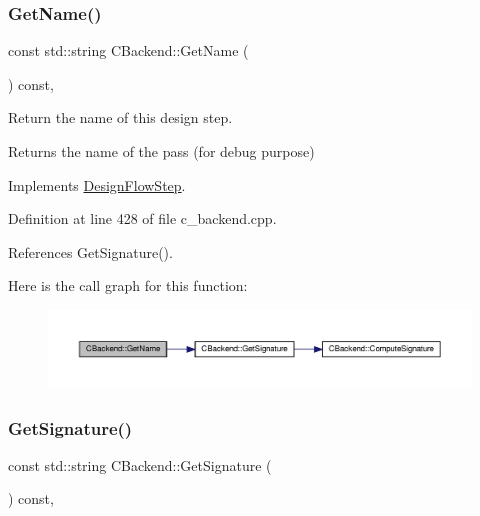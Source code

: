 \subsubsection{\texorpdfstring{Get\+Name()}{GetName()}}
{\footnotesize\ttfamily const std\+::string C\+Backend\+::\+Get\+Name (\begin{DoxyParamCaption}{ }\end{DoxyParamCaption}) const\hspace{0.3cm}{\ttfamily [override]}, {\ttfamily [virtual]}}



Return the name of this design step. 

\begin{DoxyReturn}{Returns}
the name of the pass (for debug purpose) 
\end{DoxyReturn}


Implements \hyperlink{classDesignFlowStep_a01e5ebfab88db3b3b7f832f80075fad8}{Design\+Flow\+Step}.



Definition at line 428 of file c\+\_\+backend.\+cpp.



References Get\+Signature().

Here is the call graph for this function\+:
\nopagebreak
\begin{figure}[H]
\begin{center}
\leavevmode
\includegraphics[width=350pt]{d3/de2/classCBackend_af879cc47d9bc18eb778390825b85667d_cgraph}
\end{center}
\end{figure}
\mbox{\label{classCBackend_aa66a47377656d5f70e26c4dd96de7ab6}} 
\subsubsection{\texorpdfstring{Get\+Signature()}{GetSignature()}}
{\footnotesize\ttfamily const std\+::string C\+Backend\+::\+Get\+Signature (\begin{DoxyParamCaption}{ }\end{DoxyParamCaption}) const\hspace{0.3cm}{\ttfamily [override]}, {\ttfamily [virtual]}}



